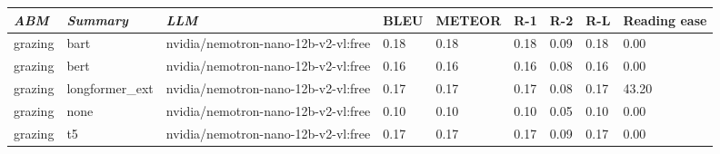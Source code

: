 \begin{tabular}{|l|l|l|l|l|l|l|l|l|}
\hline
\textit{\textbf{ABM}} & \textit{\textbf{Summary}} & \textit{\textbf{LLM}} & BLEU & METEOR & R-1 & R-2 & R-L & Reading ease \\
 \hline
 grazing & bart & nvidia/nemotron-nano-12b-v2-vl:free & 0.18 & 0.18 & 0.18 & 0.09 & 0.18 & 0.00 \\
 \hline
 grazing & bert & nvidia/nemotron-nano-12b-v2-vl:free & 0.16 & 0.16 & 0.16 & 0.08 & 0.16 & 0.00 \\
 \hline
 grazing & longformer\_ext & nvidia/nemotron-nano-12b-v2-vl:free & 0.17 & 0.17 & 0.17 & 0.08 & 0.17 & 43.20 \\
 \hline
 grazing & none & nvidia/nemotron-nano-12b-v2-vl:free & 0.10 & 0.10 & 0.10 & 0.05 & 0.10 & 0.00 \\
 \hline
 grazing & t5 & nvidia/nemotron-nano-12b-v2-vl:free & 0.17 & 0.17 & 0.17 & 0.09 & 0.17 & 0.00 \\
\hline
\end{tabular}
